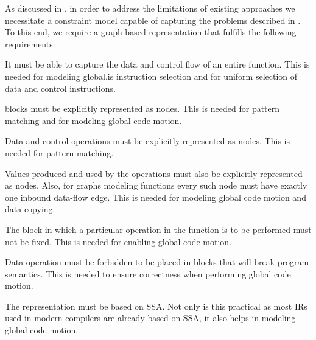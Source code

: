 As discussed in , in order to
address the limitations of existing approaches we necessitate a \gls{constraint
  model} capable of capturing the problems described in
.
%
To this end, we require a \gls{graph}-based representation that fulfills the
following requirements:
%
\begin{requirements}
  \item {}
    It must be able to capture the data and control flow of an entire
    \gls{function}.
    This is needed for modeling \gls{global.is} \gls{instruction selection}
    and for uniform selection of data and control \glspl{instruction}.
  \item {}
    \Glspl{block} must be explicitly represented as \glspl{node}.
    This is needed for \gls{pattern matching} and for modeling \gls{global code
      motion}.
  \item {}
    Data and control \glspl{operation} must be explicitly represented as
    \glspl{node}.
    This is needed for \gls{pattern matching}.
  \item {}
    Values produced and used by the \glspl{operation} must also be explicitly
    represented as \glspl{node}.
    Also, for \glspl{graph} modeling \glspl{function} every such \gls{node} must
    have exactly one inbound \gls{data-flow edge}.
    This is needed for modeling \gls{global code motion} and \gls{data copying}.
  \item {}
    The \gls{block} in which a particular \gls{operation} in the \gls{function}
    is to be performed must not be fixed.
    This is needed for enabling \gls{global code motion}.
  \item {}
    Data \gls{operation} must be forbidden to be placed in \glspl{block} that
    will break \gls{program} semantics.
    This is needed to ensure correctness when performing \gls{global code
      motion}.
  \item {}
    The representation must be based on \gls{SSA}.
    Not only is this practical as most \glspl{IR} used in modern
    \glspl{compiler} are already based on \gls{SSA}, it also helps in modeling
    \gls{global code motion}.
\end{requirements}

